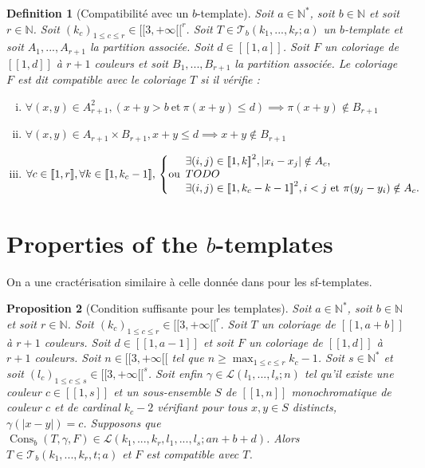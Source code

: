 \documentclass{article}
\newtheorem{definition}{Definition}[section]
\newtheorem{proposition}[definition]{Proposition}
\DeclareMathOperator{\cons}{Cons}
\begin{document}
\begin{definition}[Compatibilité avec un \(b\)-template]
Soit \(a \in \mathbb{N}^*\), soit \(b \in \mathbb{N}\) et soit \(r \in \mathbb{N}\). Soit \((k_c)_{1 \leqslant c \leqslant r} \in {[\![3, + \infty [\![}^r\). Soit \(T \in \mathcal{T}_b(k_1, ..., k_r; a)\) un \(b\)-template et soit \(A_1, ..., A_{r+1}\) la partition associée. Soit \(d \in [\![1, a]\!]\). Soit \(F\) un coloriage de \([\![1, d]\!]\) à \(r +1\) couleurs et soit \(B_1, ..., B_{r + 1}\) la partition associée. Le coloriage \(F\)  est dit compatible avec le coloriage \(T\) si il vérifie :
\begin{enumerate}[(i)]
\item \(\forall (x,y) \in A_{r+1}^2, (x + y > b ~\text{et}~ \pi(x + y) \leqslant d) \implies \pi(x + y)  \notin B_{r+1}\)
\item \(\forall (x,y) \in A_{r+1} \times B_{r+1}, x + y \leqslant d \implies x + y  \notin B_{r+1}\)
\item \(\forall c \in [\![1, r]\!], \forall k \in [\![1, k_c-1]\!], \\
	\left\{ \text{ou} 
	\begin{array}{l}
		\exists (i, j) \in {[\![1, k]\!]}^2, |x_i - x_j| \notin A_c, \\
		TODO \\
		\exists (i, j) \in {[\![1, k_c - k - 1]\!]}^2, i < j ~\text{et}~ \pi(y_j - y_i) \notin A_c.
	\end{array}
	\right.\)
\end{enumerate}
\end{definition}

\section{Properties of the \(b\)-templates}
\label{sec:results}

On a une cractérisation similaire à celle donnée dans \cite{RowleyRamsey} pour les sf-templates.
\begin{proposition}[Condition suffisante pour les templates]
Soit \(a \in \mathbb{N}^*\), soit \(b \in \mathbb{N}\) et soit \(r \in \mathbb{N}\). Soit \((k_c)_{1 \leqslant c \leqslant r} \in {[\![3, + \infty [\![}^r\). Soit \(T\) un coloriage de \([\![1,  a + b]\!]\) à \(r + 1\) couleurs. Soit \(d \in [\![1, a - 1 ]\!]\) et soit \(F\) un coloriage de \([\![1, d]\!]\) à \(r + 1\) couleurs. Soit \(n \in [\![3, + \infty [\![\) tel que \(n \geqslant \max_{1 \leqslant c \leqslant r} k_c - 1\). Soit \(s \in \mathbb{N}^*\) et soit \((l_c)_{1 \leqslant c \leqslant s} \in {[\![3, + \infty [\![}^s\). Soit enfin \(\gamma \in \mathcal{L}(l_1, ..., l_s; n)\) tel qu'il existe une couleur \(c \in [\![1, s]\!]\) et un sous-ensemble \(S\) de \([\![1, n]\!]\) monochromatique de couleur \(c\) et de cardinal \(k_c - 2\) vérifiant pour tous \(x, y \in S\) distincts, \(\gamma(|x - y|) = c\). Supposons que \(\cons_b(T, \gamma, F) \in \mathcal{L}(k_1, ..., k_r, l_1, ..., l_s; a n + b + d)\). Alors \(T \in \mathcal{T}_b(k_1, ..., k_r, t; a)\) et \(F\) est compatible avec \(T\).
\end{proposition}
\end{document}
